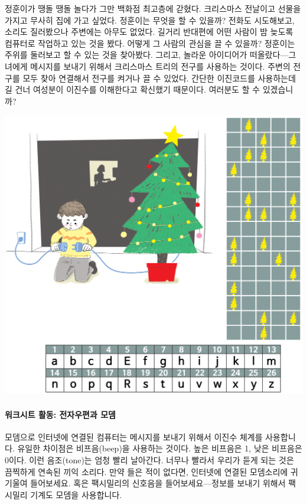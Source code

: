 \documentclass[]{article}
\begin{document}
정훈이가 땡돌 땡돌 놀다가 그만 백화점 최고층에 갇혔다. 크리스마스
전날이고 선물을 가지고 무사히 집에 가고 싶었다. 정훈이는 무엇을 할 수
있을까? 전화도 시도해보고, 소리도 질러봤으나 주변에는 아무도 없었다.
길거리 반대편에 어떤 사람이 밤 늦도록 컴퓨터로 작업하고 있는 것을 봤다.
어떻게 그 사람의 관심을 끌 수 있을까? 정훈이는 주위를 둘러보고 할 수
있는 것을 찾아봤다. 그리고, 놀라운 아이디어가 떠올랐다---그녀에게
메시지를 보내기 위해서 크리스마스 트리의 전구를 사용하는 것이다. 주변의
전구를 모두 찾아 연결해서 전구를 켜거나 끌 수 있었다. 간단한 이진코드를
사용하는데 길 건너 여성분이 이진수를 이해한다고 확신했기 때문이다.
여러분도 할 수 있겠습니까?

\includegraphics{csunplugged/01-part/img/ch01-binary/01-binary-06-sending-secret-messages.png}

\mbox{}\paragraph{워크시트 활동: 전자우편과 모뎀}\label{section-16}

모뎀으로 인터넷에 연결된 컴퓨터는 메시지를 보내기 위해서 이진수 체계를
사용합니다. 유일한 차이점은 비프음(beep)을 사용하는 것이다. 높은
비프음은 1, 낮은 비프음은 0이다. 이런 음조(tone)는 엄청 빨리 날아간다.
너무나 빨라서 우리가 듣게 되는 것은 끔찍하게 연속된 끼익 소리다. 만약
들은 적이 없다면, 인터넷에 연결된 모뎀소리에 귀 기울여 들어보세요. 혹은
팩시밀리의 신호음을 들어보세요---정보를 보내기 위해서 팩시밀리 기계도
모뎀을 사용합니다.
\end{document}
